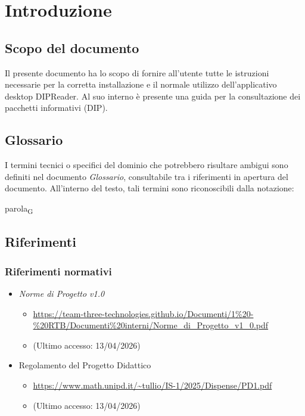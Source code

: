 \documentclass[a4paper,12pt]{article}
\begin{document}
    \section{Introduzione} {
        \subsection{Scopo del documento} {        
            Il presente documento ha lo scopo di fornire all'utente tutte le istruzioni necessarie per la corretta installazione e il normale utilizzo dell'applicativo desktop DIPReader.
            Al suo interno è presente una guida per la consultazione dei pacchetti informativi (DIP).
        }

        \subsection{Glossario}
            I termini tecnici o specifici del dominio che potrebbero risultare ambigui sono definiti nel documento \textit{Glossario}, consultabile tra i riferimenti in apertura del documento. All'interno del testo, tali termini sono 
            riconoscibili dalla notazione:
                \begin{center}
                    parola\textsubscript{G}
                \end{center}
        
        \subsection{Riferimenti} {
            \subsubsection{Riferimenti normativi} {
            \begin{itemize}
                \item \textit{Norme di Progetto v1.0}
                \begin{itemize}
                    \item \url{https://team-three-technologies.github.io/Documenti/1%20-%20RTB/Documenti%20interni/Norme_di_Progetto_v1_0.pdf}
                    \item[] (Ultimo accesso: 13/04/2026)
                \end{itemize}
                \item Regolamento del Progetto Didattico
                \begin{itemize}
                    \item \url{https://www.math.unipd.it/~tullio/IS-1/2025/Dispense/PD1.pdf}
                    \item[] (Ultimo accesso: 13/04/2026)
                \end{itemize}
            \end{itemize}
            }
}}
\end{document}
